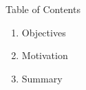 \begin{frame}[allowframebreaks]{Table of Contents}
\begin{enumerate}
    \item Objectives
    \item Motivation
    \item Summary
\end{enumerate}
\end{frame}